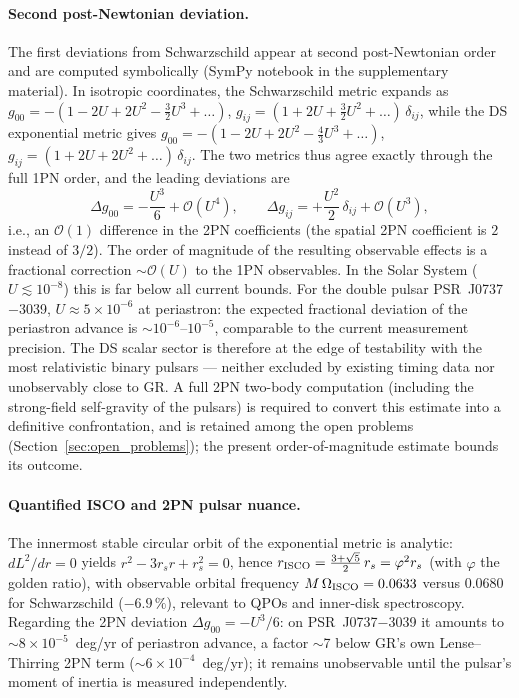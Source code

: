 \documentclass[11pt,a4paper]{article}
\theoremstyle{plain}
\theoremstyle{remark}
\begin{document}
\paragraph{Second post-Newtonian deviation.} The first deviations from Schwarzschild appear at second post-Newtonian order and are computed symbolically (SymPy notebook in the supplementary material). In isotropic coordinates, the Schwarzschild metric expands as $g_{00} = -(1 - 2U + 2U^2 - \tfrac{3}{2}U^3 + \ldots)$, $g_{ij} = (1 + 2U + \tfrac{3}{2}U^2 + \ldots)\,\delta_{ij}$, while the DS exponential metric gives $g_{00} = -(1 - 2U + 2U^2 - \tfrac{4}{3}U^3 + \ldots)$, $g_{ij} = (1 + 2U + 2U^2 + \ldots)\,\delta_{ij}$. The two metrics thus agree exactly through the full 1PN order, and the leading deviations are
\begin{equation}\label{eq:2pn_dev}
\Delta g_{00} = -\frac{U^3}{6} + \mathcal{O}(U^4), \qquad
\Delta g_{ij} = +\frac{U^2}{2}\,\delta_{ij} + \mathcal{O}(U^3),
\end{equation}
i.e., an $\mathcal{O}(1)$ difference in the 2PN coefficients (the spatial 2PN coefficient is $2$ instead of $3/2$). The order of magnitude of the resulting observable effects is a fractional correction $\sim\mathcal{O}(U)$ to the 1PN observables. In the Solar System ($U \lesssim 10^{-8}$) this is far below all current bounds. For the double pulsar PSR~J0737$-$3039, $U \approx 5\times10^{-6}$ at periastron: the expected fractional deviation of the periastron advance is $\sim 10^{-6}$--$10^{-5}$, comparable to the current measurement precision. The DS scalar sector is therefore at the edge of testability with the most relativistic binary pulsars --- neither excluded by existing timing data nor unobservably close to GR. A full 2PN two-body computation (including the strong-field self-gravity of the pulsars) is required to convert this estimate into a definitive confrontation, and is retained among the open problems (Section~\ref{sec:open_problems}); the present order-of-magnitude estimate bounds its outcome.

\paragraph{Quantified ISCO and 2PN pulsar nuance.} The innermost stable circular orbit of the exponential metric is analytic: $dL^2/dr = 0$ yields $r^2 - 3r_s r + r_s^2 = 0$, hence $r_{\rm ISCO} = \tfrac{3+\sqrt{5}}{2}\,r_s = \varphi^{2} r_s$ (with $\varphi$ the golden ratio), with observable orbital frequency $M\,\Omega_{\rm ISCO} = 0.0633$ versus $0.0680$ for Schwarzschild ($-6.9\,\%$), relevant to QPOs and inner-disk spectroscopy. Regarding the 2PN deviation $\Delta g_{00} = -U^3/6$: on PSR~J0737$-$3039 it amounts to $\sim 8\times10^{-5}$~deg/yr of periastron advance, a factor $\sim$7 below GR's own Lense--Thirring 2PN term ($\sim 6\times10^{-4}$~deg/yr); it remains unobservable until the pulsar's moment of inertia is measured independently.
\end{document}
